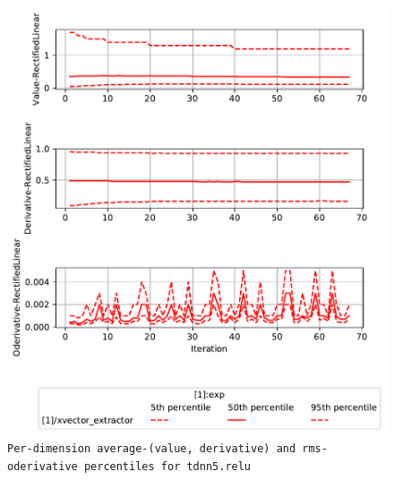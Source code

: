 \documentclass[prl,10pt,twocolumn]{revtex4}
\begin{document}
\newpage
\begin{figure}[h]
  \begin{center}
    \caption{\texttt{Per-dimension average-(value, derivative) and rms-oderivative percentiles for tdnn5.relu}}
    \includegraphics[width=\textwidth]{exp/xvector_extractor/report/nonlinstats_tdnn5_dot_relu.pdf}
  \end{center}
\end{figure}
\clearpage
\end{document}

